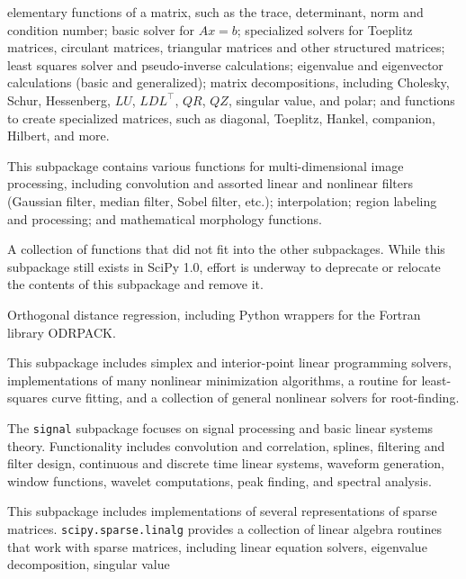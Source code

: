 \begin{description}[leftmargin=!, labelwidth=\widthof{\bfseries \texttt{interpolate}}]
    elementary functions of a matrix, such as the trace, determinant, norm and
    condition number;
    basic solver for $Ax = b$;
    specialized solvers for Toeplitz matrices, circulant matrices, triangular
    matrices and other structured matrices; least squares solver and
    pseudo-inverse calculations; eigenvalue and eigenvector calculations
    (basic and generalized); matrix decompositions, including Cholesky, Schur,
    Hessenberg, $LU$, $LDL^{\intercal}$, $QR$, $QZ$, singular value, and polar;
    and functions to create specialized matrices, such as diagonal, Toeplitz,
    Hankel, companion, Hilbert, and more.
\item[\texttt{ndimage}]
    This subpackage contains various functions for multi-dimensional image
    processing, including convolution and assorted linear and nonlinear
    filters (Gaussian filter, median filter, Sobel filter, etc.);
    interpolation; region labeling and processing; and mathematical morphology
    functions.
\item[\texttt{misc}]
    A collection of functions that did not fit into the other subpackages.
    While this subpackage still exists in SciPy 1.0, effort is underway
    to deprecate or relocate the contents of this subpackage and remove it.
\item[\texttt{odr}]
    Orthogonal distance regression, including Python wrappers for the Fortran
    library ODRPACK\cite{ODRPACK_Boggs}.
\item[\texttt{optimize}]
		This subpackage includes simplex and interior-point linear programming
		solvers, implementations of many nonlinear minimization algorithms,
		a routine for least-squares curve fitting, and 
		a collection of general nonlinear solvers for root-finding.
\item[\texttt{signal}]
    The \texttt{signal} subpackage focuses on signal processing and
    basic linear systems theory.  Functionality includes
    convolution and correlation, splines, filtering and filter design,
    continuous and discrete time linear systems, waveform generation,
    window functions, wavelet computations, peak finding, and spectral
    analysis.  
\item[\texttt{sparse}]
    This subpackage includes implementations of several representations of
    sparse matrices.\newline %
		\texttt{scipy.sparse.linalg} provides a collection of linear algebra routines that work with
		sparse matrices, including linear equation solvers, eigenvalue decomposition, singular value

\end{description}
